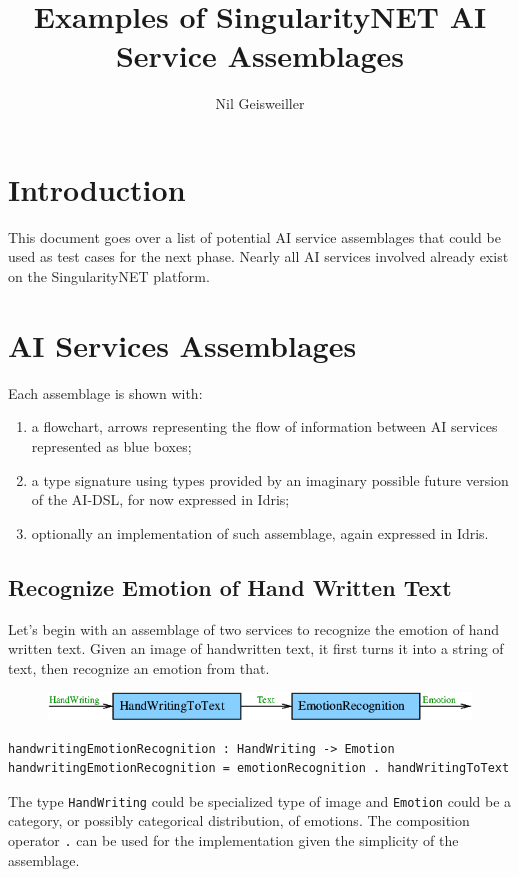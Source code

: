\documentclass[]{article}
\begin{document}
\title{Examples of SingularityNET AI Service Assemblages}
\author{Nil Geisweiller}
\maketitle

\section{Introduction}
This document goes over a list of potential AI service assemblages
that could be used as test cases for the next phase.  Nearly all AI
services involved already exist on the SingularityNET platform.

\section{AI Services Assemblages}
Each assemblage is shown with:
\begin{enumerate}
\item a flowchart, arrows representing the flow of information between
  AI services represented as blue boxes;
\item a type signature using types provided by an imaginary possible
  future version of the AI-DSL, for now expressed in Idris;
\item optionally an implementation of such assemblage, again expressed
  in Idris.
\end{enumerate}

\subsection{Recognize Emotion of Hand Written Text}
Let's begin with an assemblage of two services to recognize the
emotion of hand written text.  Given an image of handwritten text, it
first turns it into a string of text, then recognize an emotion from
that.
\begin{figure}[H]
  \centering
  \includegraphics[scale=0.55]{figs/HandWritingEmotionRecognition.png}
\end{figure}
\begin{verbatim}
handwritingEmotionRecognition : HandWriting -> Emotion
handwritingEmotionRecognition = emotionRecognition . handWritingToText
\end{verbatim}
The type \texttt{HandWriting} could be specialized type of image and
\texttt{Emotion} could be a category, or possibly categorical
distribution, of emotions.  The composition operator \texttt{.} can be
used for the implementation given the simplicity of the assemblage.
\end{document}
